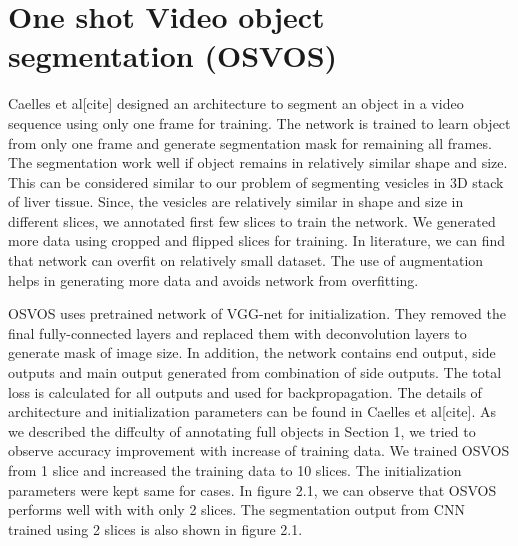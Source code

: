 \section{One shot Video object segmentation (OSVOS)}
Caelles et al[cite] designed an architecture to segment an object in a video sequence using only one frame for training. The network is trained to learn object from only one frame and generate segmentation mask for remaining all frames. The segmentation work well if object remains in relatively similar shape and size. This can be considered similar to our problem of segmenting vesicles in 3D stack of liver tissue. Since, the vesicles are relatively similar in shape and size in different slices, we annotated first few slices to train the network. We generated more data using cropped and flipped slices for training. In literature, we can find that network can overfit on relatively small dataset. The use of augmentation helps in generating more data and avoids network from overfitting. \par
OSVOS uses pretrained network of VGG-net for initialization. They removed the final fully-connected layers and replaced them with deconvolution layers to generate mask of image size. In addition, the network contains end output, side outputs and main output generated from combination of side outputs. The total loss is calculated for all outputs and used for backpropagation. The details of architecture and initialization parameters can be found in Caelles et al[cite]. As we described the diffculty of annotating full objects in Section 1, we tried to observe accuracy improvement with increase of training data. We trained OSVOS from 1 slice and increased the training data to 10 slices. The initialization parameters were kept same for cases. In figure 2.1, we can observe that OSVOS performs well with with only 2 slices. The segmentation output from CNN trained using 2 slices is also shown in figure 2.1.\par
